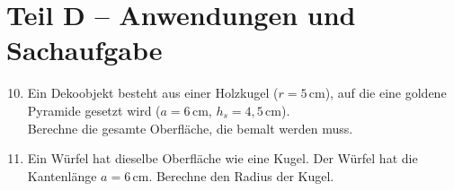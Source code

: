 \section{Teil D – Anwendungen und Sachaufgabe}

\begin{enumerate}
    \setcounter{enumi}{9}
    \item Ein Dekoobjekt besteht aus einer Holzkugel (\( r = 5\,\text{cm} \)), auf die eine goldene Pyramide gesetzt wird (\( a = 6\,\text{cm} \), \( h_s = 4{,}5\,\text{cm} \)).\\
    Berechne die gesamte Oberfläche, die bemalt werden muss.

    \item Ein Würfel hat dieselbe Oberfläche wie eine Kugel. Der Würfel hat die Kantenlänge \( a = 6\,\text{cm} \). Berechne den Radius der Kugel.
\end{enumerate}